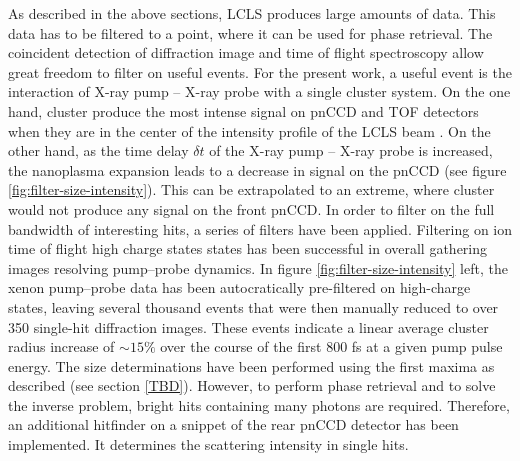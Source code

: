 As described in the above sections, LCLS produces large amounts of data. This data has to be filtered to a point, where it can be used for phase retrieval. The coincident detection of diffraction image and time of flight spectroscopy allow great freedom to filter on useful events. For the present work, a useful event is the interaction of X-ray pump -- X-ray probe with a single cluster system. On the one hand, cluster produce the most intense signal on pnCCD and TOF detectors when they are in the center of the intensity profile of the LCLS beam \citep{Gorkhover-2012-PRL}. On the other hand, as the time delay $\delta t$ of the X-ray pump -- X-ray probe is increased, the nanoplasma expansion leads to a decrease in signal on the pnCCD (see figure \ref{fig:filter-size-intensity}). This can be extrapolated to an extreme, where cluster would not produce any signal on the front pnCCD. In order to filter on the full bandwidth of interesting hits, a series of filters have been applied. Filtering on ion time of flight high charge states states has been successful in overall gathering images resolving pump--probe dynamics. In figure \ref{fig:filter-size-intensity} left, the xenon pump--probe data has been autocratically pre-filtered on high-charge states, leaving several thousand events that were then manually reduced to over 350 single-hit diffraction images. These events indicate a linear average cluster radius increase of $\sim15\%$ over the course of the first 800 fs at a given pump pulse energy. The size determinations have been performed using the first maxima as described (see section \ref{TBD}). However, to perform phase retrieval and to solve the inverse problem, bright hits containing many photons are required. Therefore, an additional hitfinder on a snippet of the rear pnCCD detector has been implemented. It determines the scattering intensity in single hits. 
%
%
%
